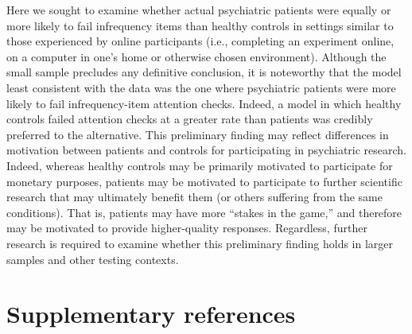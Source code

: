 \documentclass[a4paper,notitlepage,12pt]{article}
\begin{document}
\begin{refsection}[supp]
Here we sought to examine whether actual psychiatric patients were equally or more likely to fail infrequency items than healthy controls in settings similar to those experienced by online participants (i.e., completing an experiment online, on a computer in one's home or otherwise chosen environment). Although the small sample precludes any definitive conclusion, it is noteworthy that the model least consistent with the data was the one where psychiatric patients were more likely to fail infrequency-item attention checks. Indeed, a model in which healthy controls failed attention checks at a greater rate than patients was credibly preferred to the alternative. This preliminary finding may reflect differences in motivation between patients and controls for participating in psychiatric research. Indeed, whereas healthy controls may be primarily motivated to participate for monetary purposes, patients may be motivated to participate to further scientific research that may ultimately benefit them (or others suffering from the same conditions). That is, patients may have more ``stakes in the game,'' and therefore may be motivated to provide higher-quality responses. Regardless, further research is required to examine whether this preliminary finding holds in larger samples and other testing contexts. 

\section*{Supplementary references}

\printbibliography[heading=supp]
\end{refsection}
\end{document}
